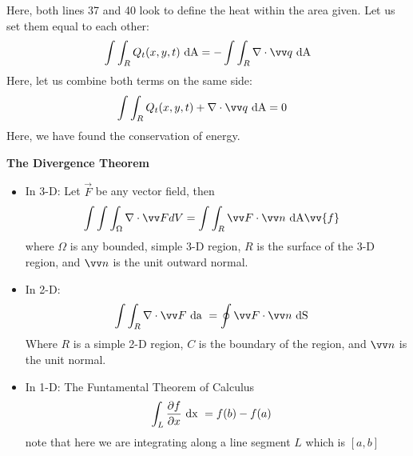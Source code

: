 \documentclass{article}
\begin{document}
\begin{enumerate}
\begin{enumerate}
  Here, both lines 37 and 40 look to define the heat within the area given. Let us set them equal to each other:
%
  \begin{align}
    \int \int_R Q_t(x, y, t) \text{ dA} & =
    - \int \int_R \grad \cdot \vv q \text{ dA}\\
  \end{align}
%
  Here, let us combine both terms on the same side:
  \begin{align}
    \int \int_R Q_t(x, y, t) + \grad \cdot \vv q \text{ dA} & = 0
  \end{align}
  Here, we have found the conservation of energy.

\end{enumerate}
\end{enumerate}
\bigskip
\textbf{The Divergence Theorem}
\begin{itemize}
  \item In 3-D: Let $\overrightarrow{F} $ be any vector field, then
  \begin{align*}
    \int \int \int_\Omega \grad \cdot \vv F dV & = \int \int_R \vv F \cdot \vv n \text{ dA} \vv{f}
  \end{align*}
  where $\Omega$ is any bounded, simple 3-D region, $R$ is the surface of the 3-D region, and $\vv n$ is the unit outward normal.
  \item In 2-D:
  \begin{align}
    \int \int_R \grad \cdot \vv F \text{ da } & = \into \vv F \cdot \vv n \text{ dS}
  \end{align}
  Where $R$ is a simple 2-D region, $C$ is the boundary of the region, and $\vv n$ is the unit normal.
  \item In 1-D: The Funtamental Theorem of Calculus
  \begin{align}
    \int_L \frac{\partial f}{\partial x} \text{ dx } & = f(b) - f(a)
  \end{align}
  note that here we are integrating along a line segment $L$ which is $[a, b]$
\end{itemize}
\end{document}
